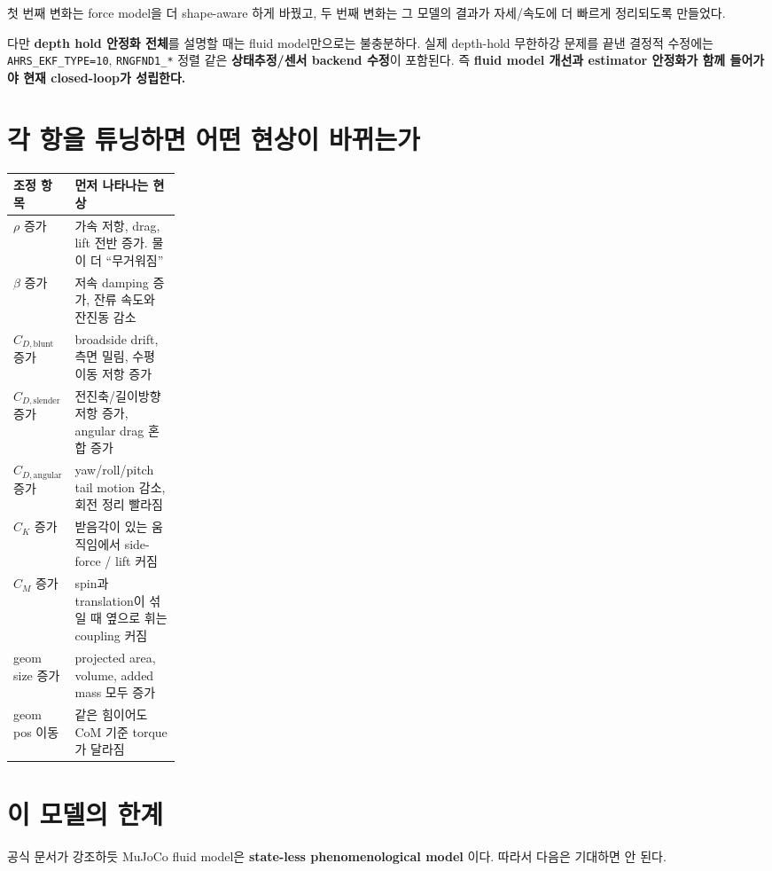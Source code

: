 \documentclass[11pt,a4paper]{article}
\newcommand{\code}[1]{\nolinkurl{#1}}
\begin{document}
첫 번째 변화는 force model을 더 shape-aware 하게 바꿨고, 두 번째 변화는 그 모델의 결과가 자세/속도에 더 빠르게 정리되도록 만들었다.

다만 \textbf{depth hold 안정화 전체}를 설명할 때는 fluid model만으로는 불충분하다. 실제 depth-hold 무한하강 문제를 끝낸 결정적 수정에는 \code{AHRS\_EKF\_TYPE=10}, \code{RNGFND1\_*} 정렬 같은 \textbf{상태추정/센서 backend 수정}이 포함된다. 즉 \textbf{fluid model 개선과 estimator 안정화가 함께 들어가야 현재 closed-loop가 성립한다.}

\section{각 항을 튜닝하면 어떤 현상이 바뀌는가}

\begin{center}
\small
\begin{tabularx}{\linewidth}{>{\raggedright\arraybackslash}p{0.22\linewidth}Y}
\toprule
조정 항목 & 먼저 나타나는 현상 \\
\midrule
\(\rho\) 증가 & 가속 저항, drag, lift 전반 증가. 물이 더 ``무거워짐'' \\
\(\beta\) 증가 & 저속 damping 증가, 잔류 속도와 잔진동 감소 \\
\(C_{D,\text{blunt}}\) 증가 & broadside drift, 측면 밀림, 수평 이동 저항 증가 \\
\(C_{D,\text{slender}}\) 증가 & 전진축/길이방향 저항 증가, angular drag 혼합 증가 \\
\(C_{D,\text{angular}}\) 증가 & yaw/roll/pitch tail motion 감소, 회전 정리 빨라짐 \\
\(C_K\) 증가 & 받음각이 있는 움직임에서 side-force / lift 커짐 \\
\(C_M\) 증가 & spin과 translation이 섞일 때 옆으로 휘는 coupling 커짐 \\
geom size 증가 & projected area, volume, added mass 모두 증가 \\
geom pos 이동 & 같은 힘이어도 CoM 기준 torque가 달라짐 \\
\bottomrule
\end{tabularx}
\end{center}

\section{이 모델의 한계}

공식 문서가 강조하듯 MuJoCo fluid model은 \textbf{state-less phenomenological model} 이다. 따라서 다음은 기대하면 안 된다.
\end{document}
